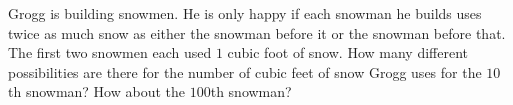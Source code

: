 Grogg is building snowmen. He is only happy if each snowman he builds uses twice as much snow as either the snowman before it or the snowman before that. The first two snowmen each used $1$ cubic foot of snow. How many different possibilities are there for the number of cubic feet of snow Grogg uses for the $10$th snowman? How about the $100$th snowman?
